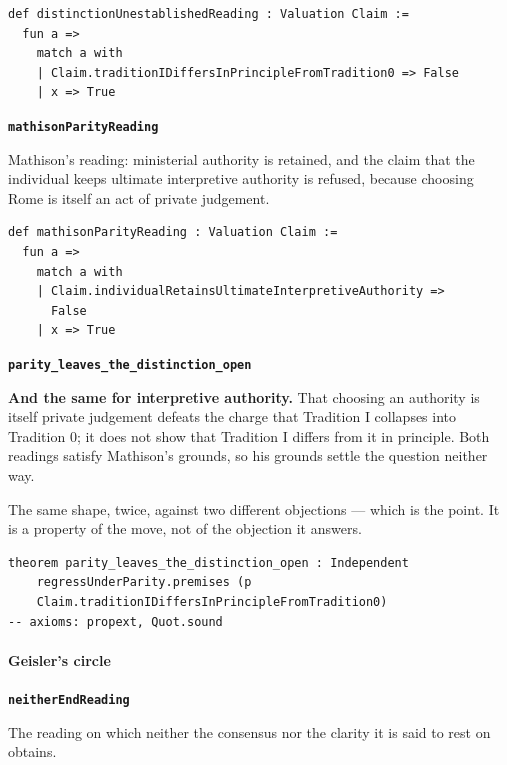\documentclass[11pt]{article}
\begin{document}
{\small\begin{verbatim}
def distinctionUnestablishedReading : Valuation Claim :=
  fun a =>
    match a with
    | Claim.traditionIDiffersInPrincipleFromTradition0 => False
    | x => True
\end{verbatim}}
\par\medskip\noindent\textbf{\texttt{mathison\allowbreak{}Parity\allowbreak{}Reading}}\par\nobreak\noindent
Mathison’s reading: ministerial authority is retained, and the claim that the individual keeps ultimate interpretive authority is refused, because choosing Rome is itself an act of private judgement.

{\small\begin{verbatim}
def mathisonParityReading : Valuation Claim :=
  fun a =>
    match a with
    | Claim.individualRetainsUltimateInterpretiveAuthority =>
      False
    | x => True
\end{verbatim}}
\par\medskip\noindent\textbf{\texttt{parity\_\allowbreak{}leaves\_\allowbreak{}the\_\allowbreak{}distinction\_\allowbreak{}open}}\par\nobreak\noindent
\textbf{And the same for interpretive authority.} That choosing an authority is itself private judgement defeats the charge that Tradition I collapses into Tradition 0; it does not show that Tradition I differs from it in principle. Both readings satisfy Mathison’s grounds, so his grounds settle the question neither way.

The same shape, twice, against two different objections — which is the point. It is a property of the move, not of the objection it answers.

{\small\begin{verbatim}
theorem parity_leaves_the_distinction_open : Independent
    regressUnderParity.premises (p
    Claim.traditionIDiffersInPrincipleFromTradition0)
-- axioms: propext, Quot.sound
\end{verbatim}}
\paragraph*{Geisler’s circle}
\leavevmode\par\nobreak
\par\medskip\noindent\textbf{\texttt{neither\allowbreak{}End\allowbreak{}Reading}}\par\nobreak\noindent
The reading on which neither the consensus nor the clarity it is said to rest on obtains.
\end{document}
